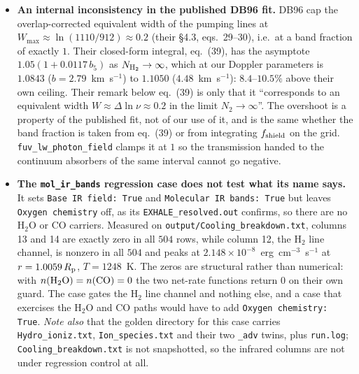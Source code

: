 \documentclass[english,a4paper]{my_memo}
\begin{document}
\begin{itemize}
\item \textbf{An internal inconsistency in the published DB96 fit.} DB96 cap
  the overlap-corrected equivalent width of the pumping lines at $W_{\max}
  \approx \ln(1110/912) \approx 0.2$ (their \S4.3, eqs.\ 29--30), i.e.\ at a
  band fraction of exactly $1$. Their closed-form integral, eq.~(39), has the
  asymptote $1.05(1 + 0.0117\,b_5)$ as $N_{\rm H_2} \rightarrow \infty$, which
  at our Doppler parameters is $1.0843$ ($b = 2.79$~km~s$^{-1}$) to $1.1050$
  ($4.48$~km~s$^{-1}$): $8.4$--$10.5\%$ above their own ceiling. Their remark
  below eq.~(39) is only that it ``corresponds to an equivalent width
  $W \approx \Delta\ln\nu \approx 0.2$ in the limit $N_2 \rightarrow
  \infty$''. The overshoot is a property of
  the published fit, not of our use of it, and is the same whether the band
  fraction is taken from eq.~(39) or from integrating $f_{\rm shield}$ on the
  grid. \texttt{fuv\_lw\_photon\_field} clamps it at $1$ so the transmission
  handed to the continuum absorbers of the same interval cannot go negative.

\item \textbf{The \texttt{mol\_ir\_bands} regression case does not test what
  its name says.} It sets \texttt{Base IR field: True} and
  \texttt{Molecular IR bands: True} but leaves \texttt{Oxygen chemistry} off,
  as its \texttt{EXHALE\_resolved.out} confirms, so there are no H$_2$O or CO
  carriers. Measured on
  \texttt{output/\allowbreak Cooling\_breakdown.txt}, columns 13 and 14 are exactly zero
  in all $504$ rows, while column 12, the H$_2$ line channel, is nonzero
  in all $504$ and peaks at $2.148\times10^{-8}$~erg~cm$^{-3}$~s$^{-1}$ at
  $r = 1.0059\,R_{\rm p}$, $T = 1248$~K. The zeros are structural rather than
  numerical: with $n({\rm H_2O}) = n({\rm CO}) = 0$ the two net-rate functions
  return $0$ on their own guard. The case gates the H$_2$ line channel and
  nothing else, and a case that exercises the H$_2$O and CO paths would have
  to add \texttt{Oxygen chemistry: True}.
  \emph{Note also} that the golden directory for this case carries
  \texttt{Hydro\_ioniz.txt}, \texttt{Ion\_species.txt} and their two
  \texttt{\_adv} twins, plus \texttt{run.log};
  \texttt{Cooling\_breakdown.txt} is not snapshotted, so the infrared columns
  are not under regression control at all.

\end{itemize}
\end{document}
